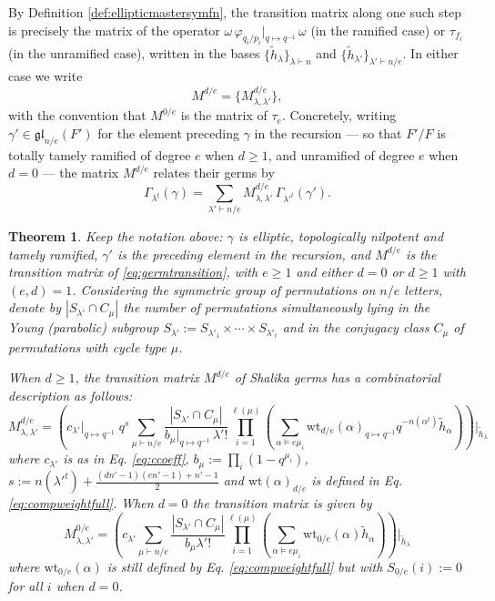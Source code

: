 \documentclass{amsart}
\numberwithin{equation}{section}
\newtheorem{theorem}[lemma]{Theorem}%
\theoremstyle{definition}
\def\tilde{\widetilde}
\renewcommand{\th}{\tilde{h}}
\newcommand{\wt}{\mathrm{wt}}
\newcommand{\fgl}{\mathfrak{gl}}
\begin{document}
By Definition \ref{def:ellipticmastersymfn}, the transition matrix along one such step is precisely the matrix of the operator $\omega\, \varphi_{q_i/p_i}|_{q\mapsto q^{-1}}\, \omega$ (in the ramified case) or $\tau_{f_i}$ (in the unramified case), written in the bases $\{\th_\lambda\}_{\lambda\vdash n}$ and $\{\th_{\lambda'}\}_{\lambda'\vdash n/e}$. In either case we write
\begin{equation}
    M^{d/e}=\{M^{d/e}_{\lambda,\lambda'}\},
\end{equation}
with the convention that $M^{0/e}$ is the matrix of $\tau_e$. Concretely, writing $\gamma'\in\fgl_{n/e}(F')$ for the element preceding $\gamma$ in the recursion --- so that $F'/F$ is totally tamely ramified of degree $e$ when $d\ge1$, and unramified of degree $e$ when $d=0$ --- the matrix $M^{d/e}$ relates their germs by
\begin{equation}
\label{eq:germtransition}
\Gamma_{\lambda^t}(\gamma)=\sum_{\lambda'\vdash n/e} M^{d/e}_{\lambda,\lambda'}\,\Gamma_{{\lambda'}^t}(\gamma').
\end{equation}
\begin{theorem}
\label{thm:transitionmatrix}
Keep the notation above: $\gamma$ is elliptic, topologically nilpotent and tamely ramified, $\gamma'$ is the preceding element in the recursion, and $M^{d/e}$ is the transition matrix of \eqref{eq:germtransition}, with $e\geq 1$ and either $d=0$ or $d\geq 1$ with $(e,d)=1$. Considering the symmetric group of permutations on $n/e$ letters, denote by $|S_{\lambda'}\cap C_\mu|$ the number of permutations simultaneously lying in the Young (parabolic) subgroup $S_{\lambda'}:=S_{\lambda'_1}\times\cdots\times S_{\lambda'_{\ell}}$ and in the conjugacy class $C_\mu$ of permutations with cycle type $\mu$.

When $d\geq 1$, the transition matrix $M^{d/e}$ of Shalika germs
has a combinatorial description as follows:
\begin{equation}
\label{eq:transitionmatrix}
M_{\lambda,\lambda'}^{d/e}=\left(c_{\lambda'}|_{q\mapsto q^{-1}}\; q^{s} \sum_{\mu\vdash n/e} \frac{|S_{\lambda'}\cap C_\mu|}{b_\mu|_{q\mapsto q^{-1}}\, \lambda'!}\prod_{i=1}^{\ell(\mu)}(\sum_{\alpha\vDash e\mu_i} \wt_{d/e}(\alpha)_{q\mapsto q^{-1}} q^{-n(\alpha^t)}\th_\alpha)\right)\Bigg|_{\th_\lambda}
\end{equation}
where $c_{\lambda'}$ is as in Eq. \eqref{eq:ccoeff}, $b_\mu:=\prod_i (1-q^{\mu_i})$, $s:=n({\lambda'}^t)+\frac{(dn'-1)(en'-1)+n'-1}{2}$ and $\wt(\alpha)_{d/e}$ is defined in Eq. \eqref{eq:compweightfull}. When $d=0$ the transition matrix is given by
\begin{equation}
\label{eq:transitionmatrixunr}
M_{\lambda,\lambda'}^{0/e}=\left(c_{\lambda'}\sum_{\mu\vdash n/e} \frac{|S_{\lambda'}\cap C_\mu|}{b_\mu \lambda'!}\prod_{i=1}^{\ell(\mu)}(\sum_{\alpha\vDash e\mu_i} \wt_{0/e}(\alpha)\th_\alpha)\right)\Bigg|_{\th_\lambda}
\end{equation}
where $\wt_{0/e}(\alpha)$ is still defined by Eq. \eqref{eq:compweightfull} but with $S_{0/e}(i):=0$ for all $i$ when $d=0$. 
\end{theorem}
\end{document}
